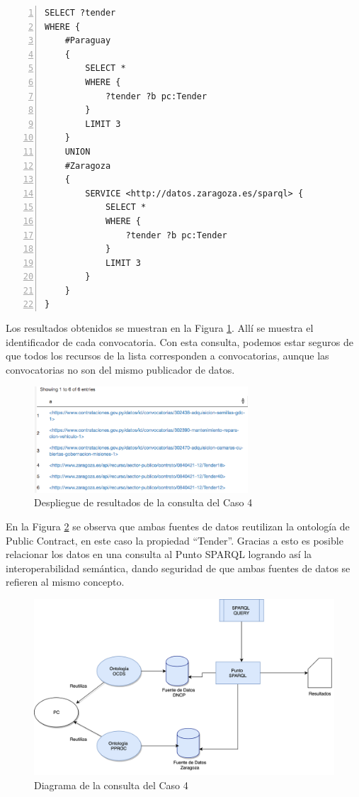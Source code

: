 \noindent\begin{minipage}[c]{\textwidth}
 \begin{lstlisting}[captionpos=b, caption=Consulta a dos fuentes de datos utilizando el mismo concepto, label={lst:caso4-2},  numbers=left,  numberstyle=\tiny\color{mygray},frame=single]
SELECT ?tender
WHERE {
    #Paraguay
    { 
        SELECT * 
        WHERE {
            ?tender ?b pc:Tender 
        } 
        LIMIT 3 
    }
    UNION 
    #Zaragoza
    { 
        SERVICE <http://datos.zaragoza.es/sparql> {
            SELECT * 
            WHERE {
                ?tender ?b pc:Tender 
            } 
            LIMIT 3
        }
    }
}
 \end{lstlisting}
\end{minipage}
 Los resultados obtenidos se muestran en la Figura \ref{img:caso4Resultado}. Allí se muestra el identificador de cada convocatoria. Con esta consulta, podemos estar seguros de que todos los recursos de la lista corresponden a convocatorias, aunque las convocatorias no son del mismo publicador de datos.



\begin{figure}[ht!]
    \centering
    \includegraphics[width=80mm]{figuras/caso4Resultado.png}
    \caption{Despliegue de resultados de la consulta del Caso 4}
    \label{img:caso4Resultado}
 \end{figure}

 En la Figura \ref{img:Diagramas-Caso 4} se observa que ambas fuentes de datos reutilizan la ontología de Public Contract, en este caso la propiedad “Tender”. Gracias a esto es posible relacionar los datos en una consulta al Punto SPARQL logrando así la interoperabilidad semántica, dando seguridad de que ambas fuentes de datos se refieren al mismo concepto.

 \begin{figure}[ht!]
    \centering
    \includegraphics[width=150mm]{figuras/Diagramas-Caso4.png}
    \caption{Diagrama de la consulta del Caso 4}
    \label{img:Diagramas-Caso 4}
 \end{figure}
